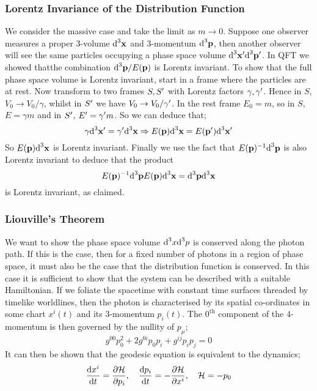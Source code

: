\subsubsection*{Lorentz Invariance of the Distribution Function}
We consider the massive case and take the limit as $m \rightarrow 0$. Suppose one observer measures a proper $3$-volume $\text{d}^3 \mathbf x$ and $3$-momentum $\text{d}^3 \mathbf p$, then another observer will see the same particles occupying a phase space volume $\text{d}^3 \mathbf{x}^{\prime} \text{d}^3 \mathbf{p}^{\prime}$. In QFT we showed that\footnotemark the combination $\text{d}^3 \mathbf{p}/E(\mathbf{p})$ is Lorentz invariant. To show that the full phase space volume is Lorentz invariant, start in a frame where the particles are at rest. Now transform to two frames $S, S^{\prime}$ with Lorentz factors $\gamma, \gamma^{\prime}$. Hence in $S$, $V_0 \rightarrow V_0/\gamma$, whilst in $S^{\prime}$ we have $V_0 \rightarrow V_0/\gamma^{\prime}$. In the rest frame $E_0 = m$, so in $S$, $E = \gamma m$ and in $S^{\prime}$, $E^{\prime} = \gamma^{\prime} m$. So we can deduce that;
\begin{equation}
\gamma\text{d}^3 \mathbf{x}^{\prime} = \gamma^{\prime} \text{d}^3 \mathbf x \Rightarrow E(\mathbf p)\text{d}^3 \mathbf{x} = E(\mathbf{p}^{\prime})\text{d}^3 \mathbf{x}^{\prime}
\end{equation}
So $E(\mathbf p)\text{d}^3 \mathbf x$ is Lorentz invariant. Finally we use the fact that $E(\mathbf p)^{-1}\text{d}^3 \mathbf p$ is also Lorentz invariant to deduce that the product
\begin{equation*}
E(\mathbf p)^{-1}\text{d}^3 \mathbf{p} E(\mathbf p)\text{d}^3 \mathbf x = \text{d}^3 \mathbf{p}\text{d}^3 \mathbf x
\end{equation*}
is Lorentz invariant, as claimed.
\subsubsection*{Liouville's Theorem}
We want to show the phase space volume $\text{d}^3 x\text{d}^3 p$ is conserved along the photon path. If this is the case, then for a fixed number of photons in a region of phase space, it must also be the case that the distribution function is conserved. In this case it is sufficient to show that the system can be described with a suitable Hamiltonian. If we foliate the spacetime with constant time surfaces threaded by timelike worldlines, then the photon is characterised by its spatial co-ordinates in some chart $x^i(t)$ and its $3$-momentum $p_i(t)$. The $0^{\text{th}}$ component of the $4$-momentum is then governed by the nullity of $p_\mu$;
\begin{equation}
g^{00}p_0^2 + 2g^{0i}p_0 p_i + g^{ij}p_i p_j = 0
\end{equation}
It can then be shown that the geodesic equation is equivalent to the dynamics;
\begin{equation}
\frac{\text{d} x^i}{\text{d} t} = \frac{\partial \mathcal{H}}{\partial p_i}, \quad \frac{\text{d} p_i}{\text{d} t} = -\frac{\partial\mathcal{H}}{\partial x^i} , \quad \mathcal{H} = -p_0
\end{equation}
